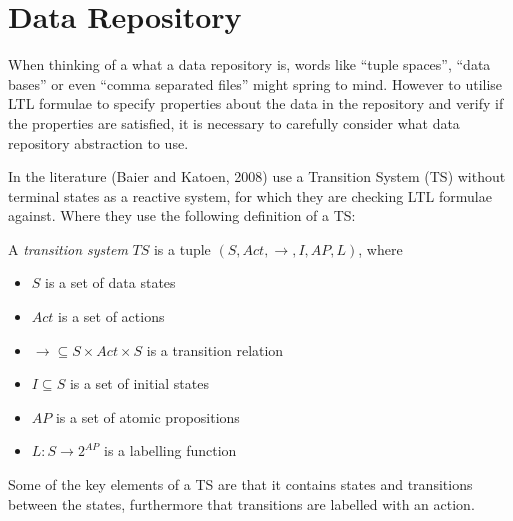 \section{Data Repository}\label{sec:data-repository}
When thinking of a what a data repository is, words like ``tuple spaces'', ``data bases'' or even ``comma separated files'' might spring to mind. However to utilise LTL formulae to specify properties about the data in the repository and verify if the properties are satisfied, it is necessary to carefully consider what data repository abstraction to use. 

In the literature (Baier and Katoen, 2008)\cite{baier2008principles} use a Transition System (TS) without terminal states as a reactive system, for which they are checking LTL formulae against. Where they use the following definition of a TS:
\begin{definition}\label{def:ts}
A \emph{transition system} $TS$ is a tuple $\left(S, Act, \longrightarrow, I, AP, L \right)$, where
\begin{itemize}
  \item $S$ is a set of data states
  \item $Act$ is a set of actions
  \item $\longrightarrow \subseteq S \times Act \times S$ is a transition relation
  \item $I \subseteq S$ is a set of initial states
  \item $AP$ is a set of atomic propositions
  \item $L : S \rightarrow 2^{AP}$ is a labelling function
\end{itemize}
\end{definition}
Some of the key elements of a TS are that it contains states and transitions between the states, furthermore that transitions are labelled with an action. 

